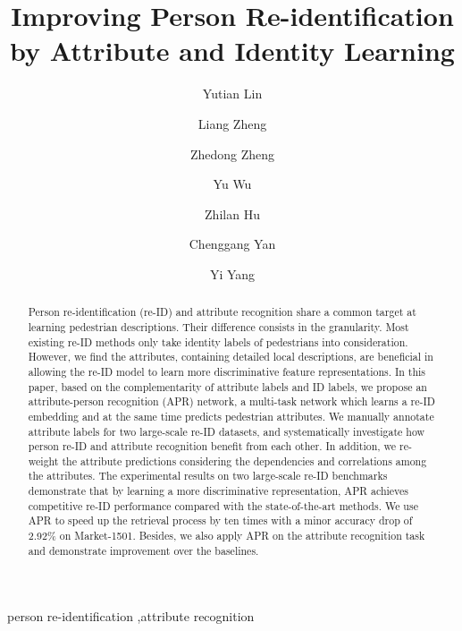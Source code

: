 \documentclass[5p,times,twocolumn]{elsarticle}
\begin{document}
\begin{frontmatter}

\title{Improving Person Re-identification by Attribute and Identity Learning}
\author[ad1]{Yutian Lin}
\author[ad2]{Liang Zheng}
\author[ad1]{Zhedong Zheng}
\author[ad1]{Yu Wu}
\author[ad1]{Zhilan Hu}
\author[ad3]{Chenggang Yan}
\author[ad1]{Yi Yang}
\address[ad1]{Centre for Artificial Intelligence, University of Technology Sydney}
\address[ad2]{Australian National University}
\address[ad3]{Hangzhou Dianzi University}


\begin{abstract}
Person re-identification (re-ID) and attribute recognition share a common target at learning pedestrian descriptions. Their difference consists in the granularity. 
Most existing re-ID methods only take identity labels of pedestrians into consideration. However, we find the attributes, containing detailed local descriptions, are beneficial in allowing the re-ID model to learn more discriminative feature representations.
In this paper, based on the complementarity of attribute labels and ID labels, we propose an attribute-person recognition (APR) network, a multi-task network which learns a re-ID embedding and at the same time predicts pedestrian attributes.
We manually annotate attribute labels for two large-scale re-ID datasets, and systematically investigate how person re-ID and attribute recognition benefit from each other. 
In addition, we re-weight the attribute predictions considering the dependencies and correlations among the attributes.
The experimental results on two large-scale re-ID benchmarks demonstrate that by learning a more discriminative representation, APR achieves competitive re-ID performance compared with the state-of-the-art methods. 
We use APR to speed up the retrieval process by ten times with a minor accuracy drop of 2.92\% on Market-1501.
Besides, we also apply APR on the attribute recognition task and demonstrate improvement over the baselines. 

\end{abstract}

\begin{keyword}
person re-identification \sep attribute recognition
\end{keyword}

\end{frontmatter}
\end{document}
